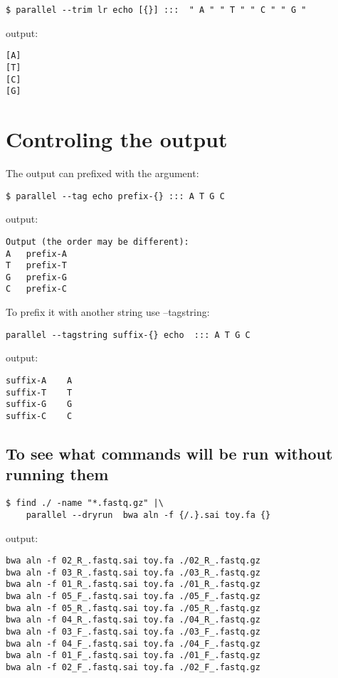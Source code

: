 \documentclass{article}
\begin{document}
\begin{lstlisting}
$ parallel --trim lr echo [{}] :::  " A " " T " " C " " G "
\end{lstlisting}
output:
\begin{lstlisting}
[A]
[T]
[C]
[G]
\end{lstlisting}

\section{Controling the output}
The output can prefixed with the argument:
\begin{lstlisting}
$ parallel --tag echo prefix-{} ::: A T G C
\end{lstlisting}
output:
\begin{lstlisting}Output (the order may be different):
A	prefix-A
T	prefix-T
G	prefix-G
C	prefix-C
\end{lstlisting}

To prefix it with another string use --tagstring:
\begin{lstlisting}
parallel --tagstring suffix-{} echo  ::: A T G C
\end{lstlisting}
output:
\begin{lstlisting}
suffix-A	A
suffix-T	T
suffix-G	G
suffix-C	C
\end{lstlisting}

\subsection{To see what commands will be run without running them}
\begin{lstlisting}
$ find ./ -name "*.fastq.gz" |\
	parallel --dryrun  bwa aln -f {/.}.sai toy.fa {}
\end{lstlisting}
output:
\begin{lstlisting}
bwa aln -f 02_R_.fastq.sai toy.fa ./02_R_.fastq.gz
bwa aln -f 03_R_.fastq.sai toy.fa ./03_R_.fastq.gz
bwa aln -f 01_R_.fastq.sai toy.fa ./01_R_.fastq.gz
bwa aln -f 05_F_.fastq.sai toy.fa ./05_F_.fastq.gz
bwa aln -f 05_R_.fastq.sai toy.fa ./05_R_.fastq.gz
bwa aln -f 04_R_.fastq.sai toy.fa ./04_R_.fastq.gz
bwa aln -f 03_F_.fastq.sai toy.fa ./03_F_.fastq.gz
bwa aln -f 04_F_.fastq.sai toy.fa ./04_F_.fastq.gz
bwa aln -f 01_F_.fastq.sai toy.fa ./01_F_.fastq.gz
bwa aln -f 02_F_.fastq.sai toy.fa ./02_F_.fastq.gz
\end{lstlisting}
\end{document}
